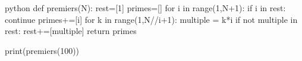 \begin{mintedbox}{python}
def premiers(N):
	rest=[1]
	primes=[]
	for i in range(1,N+1):
	    if i in rest:
	        continue
	    primes+=[i]
	    for k in range(1,N//i+1):
	        multiple = k*i
	        if not multiple in rest:
	            rest+=[multiple]
	return primes
    
print(premiers(100))
\end{mintedbox}


